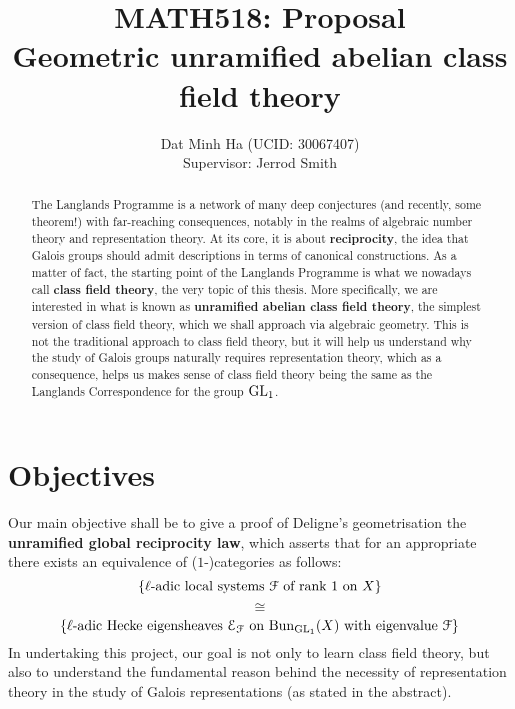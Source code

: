 
\usepackage{soul}





	\title{\textbf{MATH518: Proposal
	\\
	Geometric unramified abelian class field theory}}
	
	\author{Dat Minh Ha (UCID: 30067407)\\Supervisor: Jerrod Smith}
	\maketitle
	
	\begin{abstract}
	    The Langlands Programme is a network of many deep conjectures (and recently, some theorem!) with far-reaching consequences, notably in the realms of algebraic number theory and representation theory. At its core, it is about \textbf{reciprocity}, the idea that Galois groups should admit descriptions in terms of canonical constructions. As a matter of fact, the starting point of the Langlands Programme is what we nowadays call \textbf{class field theory}, the very topic of this thesis. More specifically, we are interested in what is known as \textbf{unramified abelian class field theory}, the simplest version of class field theory, which we shall approach via algebraic geometry. This is not the traditional approach to class field theory, but it will help us understand why the study of Galois groups naturally requires representation theory, which as a consequence, helps us makes sense of class field theory being the same as the Langlands Correspondence for the group $\operatorname{GL}_1$.
	
	\end{abstract}
	    
	\section{Objectives}
	    Our main objective shall be to give a proof of Deligne's geometrisation the \textbf{unramified global reciprocity law}, which asserts that for an appropriate there exists an equivalence of ($1$-)categories as follows:
	        $$\left\{\text{$\ell$-adic local systems $\mathcal{F}$ of rank $1$ on $X$}\right\}$$
	        $$\cong$$
	        $$\left\{\text{$\ell$-adic Hecke eigensheaves $\mathcal{E}_{\mathcal{F}}$ on $\mathrm{Bun}_{\operatorname{GL}_1}(X)$ with eigenvalue $\mathcal{F}$}\right\}$$
        In undertaking this project, our goal is not only to learn class field theory, but also to understand the fundamental reason behind the necessity of representation theory in the study of Galois representations (as stated in the abstract). 
	
